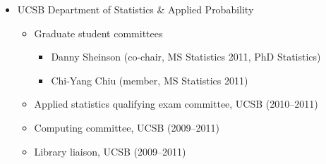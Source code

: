 \documentclass[overlapped,line,letterpaper]{res}
\begin{document}
\begin{resume}
\begin{itemize}
\begin{itemize}
\begin{itemize}
\begin{itemize}
			\end{itemize}
		\end{itemize}
	\item UCSB Department of Statistics \& Applied Probability
		\begin{itemize}
		\item Graduate student committees
			\begin{itemize}
			\item Danny Sheinson (co-chair, MS Statistics 2011, PhD Statistics)
			\item Chi-Yang Chiu (member, MS Statistics 2011)
			\end{itemize}
		\item Applied statistics qualifying exam committee, UCSB (2010--2011)
		\item Computing committee, UCSB (2009--2011)
		\item Library liaison, UCSB (2009--2011)
		\end{itemize}
 	\end{itemize}
\end{itemize}



\end{resume}
\end{document}
